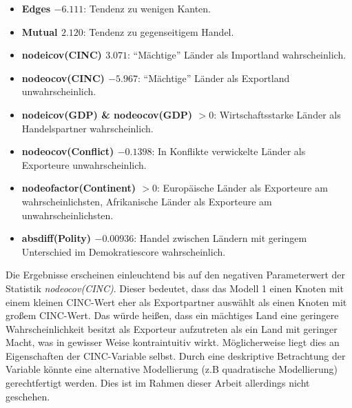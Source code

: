 \documentclass[a4paper,ngerman,oneside,titlepage,bibliography=totoc,11pt]{scrreprt}
\begin{document}
	\begin{itemize}
		\item {\textbf{Edges $-6.111$}: Tendenz zu wenigen Kanten.}
		\item {\textbf{Mutual $2.120$}: Tendenz zu gegenseitigem Handel.}
		\item {\textbf{nodeicov(CINC) $3.071$}: "`Mächtige"' Länder als Importland wahrscheinlich.}
		\item {\textbf{nodeocov(CINC) $-5.967$}: "`Mächtige"' Länder als Exportland unwahrscheinlich.}
		\item {\textbf{nodeicov(GDP) \& nodeocov(GDP) $> 0$}: Wirtschaftsstarke Länder als Handelspartner wahrscheinlich.}
		\item {\textbf{nodeocov(Conflict) $-0.1398$}: In Konflikte verwickelte Länder als Exporteure unwahrscheinlich.}
		\item {\textbf{nodeofactor(Continent) $> 0$}: Europäische Länder als Exporteure am wahrscheinlichsten, Afrikanische Länder als Exporteure am unwahrscheinlichsten.}
		\item {\textbf{absdiff(Polity) $-0.00936$}: Handel zwischen Ländern mit geringem Unterschied im Demokratiescore wahrscheinlich.}
	\end{itemize}

Die Ergebnisse erscheinen einleuchtend bis auf den negativen Parameterwert der Statistik \emph{nodeocov(CINC)}. Dieser bedeutet, dass das Modell 1 einen Knoten mit einem kleinen CINC-Wert eher als Exportpartner auswählt als einen Knoten mit großem CINC-Wert. Das würde heißen, dass ein mächtiges Land eine geringere Wahrscheinlichkeit besitzt als Exporteur aufzutreten als ein Land mit geringer Macht, was in gewisser Weise kontraintuitiv wirkt. Möglicherweise liegt dies an Eigenschaften der CINC-Variable selbst. Durch eine deskriptive Betrachtung der Variable könnte eine alternative Modellierung (z.B quadratische Modellierung) gerechtfertigt werden. Dies ist im Rahmen dieser Arbeit allerdings nicht geschehen.
\end{document}
